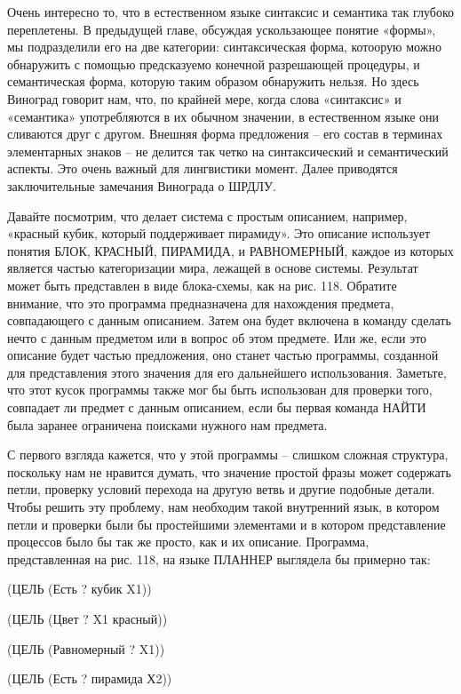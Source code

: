 \documentclass[../main.tex]{subfiles}
\begin{document}
Очень интересно то, что в естественном языке синтаксис и семантика так глубоко переплетены. В предыдущей главе, обсуждая ускользающее понятие «формы», мы подразделили его на две категории: синтаксическая форма, котоорую можно обнаружить с помощью предсказуемо конечной разрешающей процедуры, и семантическая форма, которую таким образом обнаружить нельзя. Но здесь Виноград говорит нам, что, по крайней мере, когда слова «синтаксис» и «семантика» употребляются в их обычном значении, в естественном языке они сливаются друг с другом. Внешняя форма предложения \--- его состав в терминах элементарных знаков \--- не делится так четко на синтаксический и семантический аспекты. Это очень важный для лингвистики момент. Далее приводятся заключительные замечания Винограда о ШРДЛУ.

Давайте посмотрим, что делает система с простым описанием, например, «красный кубик, который поддерживает пирамиду». Это описание использует понятия БЛОК, КРАСНЫЙ, ПИРАМИДА, и РАВНОМЕРНЫЙ, каждое из которых является частью категоризации мира, лежащей в основе системы. Результат может быть представлен в виде блока-схемы, как на рис. 118. Обратите внимание, что это программа предназначена для нахождения предмета, совпадающего с данным описанием. Затем она будет включена в команду сделать нечто с данным предметом или в вопрос об этом предмете. Или же, если это описание будет частью предложения, оно станет частью программы, созданной для представления этого значения для его дальнейшего использования. Заметьте, что этот кусок программы также мог бы быть использован для проверки того, совпадает ли предмет с данным описанием, если бы первая команда НАЙТИ была заранее ограничена поисками нужного нам предмета.

С первого взгляда кажется, что у этой программы \--- слишком сложная структура, поскольку нам не нравится думать, что значение простой фразы может содержать петли, проверку условий перехода на другую ветвь и другие подобные детали. Чтобы решить эту проблему, нам необходим такой внутренний язык, в котором петли и проверки были бы простейшими элементами и в котором представление процессов было бы так же просто, как и их описание. Программа, представленная на рис. 118, на языке ПЛАННЕР выглядела бы примерно так:

(ЦЕЛЬ (Есть ? кубик X1))

(ЦЕЛЬ (Цвет ? X1 красный))

(ЦЕЛЬ (Равномерный ? X1))

(ЦЕЛЬ (Есть ? пирамида Х2))
\end{document}
